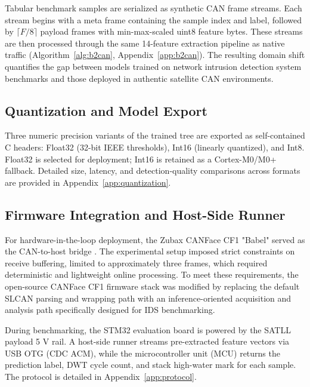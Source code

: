 Tabular benchmark samples are serialized as synthetic CAN frame streams. Each stream begins with a meta frame containing the sample index and label, followed by $\lceil F/8 \rceil$ payload frames with min-max-scaled uint8 feature bytes. These streams are then processed through the same 14-feature extraction pipeline as native traffic (Algorithm~\ref{alg:b2can}, Appendix~\ref{app:b2can}). The resulting domain shift quantifies the gap between models trained on network intrusion detection system benchmarks and those deployed in authentic satellite CAN environments.

\subsection{Quantization and Model Export}
\label{sec:quantization}

Three numeric precision variants of the trained tree are exported as self-contained C headers: Float32 (32-bit IEEE thresholds), Int16 (linearly quantized), and Int8. Float32 is selected for deployment; Int16 is retained as a Cortex-M0/M0+ fallback. Detailed size, latency, and detection-quality comparisons across formats are provided in Appendix~\ref{app:quantization}.


\subsection{Firmware Integration and Host-Side Runner}
\label{sec:firmware}

For hardware-in-the-loop deployment, the Zubax CANFace CF1 "Babel" served as the CAN-to-host bridge \cite{ZubaxBabelShop2026}. The experimental setup imposed strict constraints on receive buffering, limited to approximately three frames, which required deterministic and lightweight online processing. To meet these requirements, the open-source CANFace CF1 firmware stack \cite{ZubaxCanfaceCF1Repo2026} was modified by replacing the default SLCAN parsing and wrapping path with an inference-oriented acquisition and analysis path specifically designed for IDS benchmarking.

During benchmarking, the STM32 evaluation board is powered by the SATLL payload 5 V rail. A host-side runner streams pre-extracted feature vectors via USB OTG (CDC ACM), while the microcontroller unit (MCU) returns the prediction label, DWT cycle count, and stack high-water mark for each sample. The protocol is detailed in Appendix~\ref{app:protocol}.

